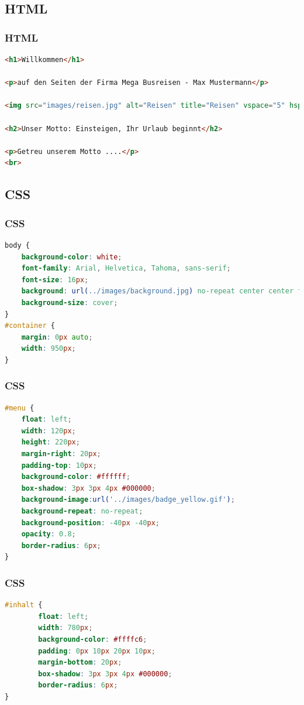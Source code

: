 \documentclass[xcolor=dvipsnames]{beamer}
\begin{document}
\subsection{HTML}
\begin{frame}[fragile]
\frametitle{HTML}

\begin{lstlisting}[language=HTML]
<h1>Willkommen</h1>

<p>auf den Seiten der Firma Mega Busreisen - Max Mustermann</p>

<img src="images/reisen.jpg" alt="Reisen" title="Reisen" vspace="5" hspace="5" align="left">

<h2>Unser Motto: Einsteigen, Ihr Urlaub beginnt</h2>

<p>Getreu unserem Motto ....</p>
<br>

\end{lstlisting}
\end{frame}

\subsection{CSS}
\begin{frame}[fragile]
\frametitle{CSS}

\begin{lstlisting}[language=CSS]
body {
    background-color: white;
    font-family: Arial, Helvetica, Tahoma, sans-serif;
    font-size: 16px;
    background: url(../images/background.jpg) no-repeat center center fixed;
    background-size: cover;
}
#container {
    margin: 0px auto;
    width: 950px;
}

\end{lstlisting}
\end{frame}

\begin{frame}[fragile]
\frametitle{CSS}

\begin{lstlisting}[language=CSS, firstnumber=12]
#menu {
    float: left;
    width: 120px;
    height: 220px;
    margin-right: 20px;
    padding-top: 10px;
    background-color: #ffffff;
    box-shadow: 3px 3px 4px #000000;
    background-image:url('../images/badge_yellow.gif');
    background-repeat: no-repeat;
    background-position: -40px -40px;
    opacity: 0.8;
    border-radius: 6px;
}
\end{lstlisting}
\end{frame}

\begin{frame}[fragile]
\frametitle{CSS}

\begin{lstlisting}[language=CSS, firstnumber=51]
#inhalt {
        float: left;
        width: 780px;
        background-color: #ffffc6;
        padding: 0px 10px 20px 10px;
        margin-bottom: 20px;
        box-shadow: 3px 3px 4px #000000;
        border-radius: 6px;
}

\end{lstlisting}
\end{frame}
\end{document}
